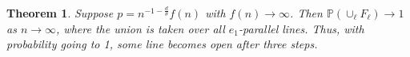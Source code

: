 \documentclass{amsart}
\newcommand{\one}{\mathbf{1}}
\newcommand{\prob}{\mathbb{P}}
\newcommand{\threshold}{\theta}
\newcommand{\noodle}{r}
\newcommand{\I}[2]{\hbox{Initial}\left(#1, \geq #2\right)}
\newcommand{\Gtwo}[1]{\hbox{Cross Lines}_r(#1)}
\numberwithin{equation}{section}
\newcommand{\Ln}{\ell}
\newtheorem{theorem}{Theorem}[section]
\newtheorem{lemma}[theorem]{Lemma}
\theoremstyle{definition}
\theoremstyle{remark}
\begin{document}
%
%
%
\begin{theorem} \label{bicuspid}
Suppose $p = n^{-1-\frac{d}{\threshold}}f(n)$ with $f(n) \to \infty$. Then $\prob(\cup_\Ln F_\Ln)\to 1$ as $n \to \infty$, where the union is taken over all $e_1$-parallel lines. Thus, with probability going to 1, some line becomes open after three steps.
\end{theorem}
\end{document}
